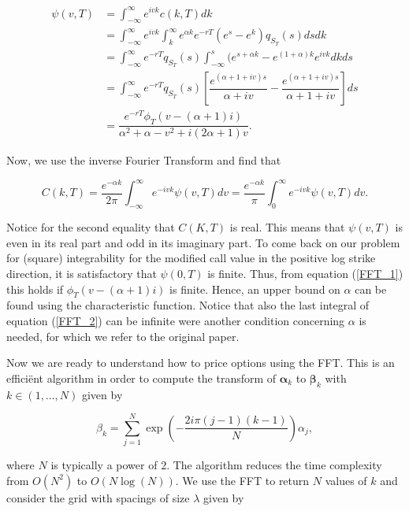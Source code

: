 \documentclass[12pt,a4paper,oneside]{book}
\begin{document}
\begin{align}\label{FFT_1}
\psi(v,T) &= \int_{-\infty}^{\infty} e^{ivk} c(k,T) dk \nonumber  \\
		  &= \int_{-\infty}^{\infty} e^{ivk} \int_{k}^{\infty} e^{\alpha k} e^{-rT} (e^s - e^k) q_{S_T}(s) ds dk \nonumber \\
		  &= \int_{-\infty}^{\infty} e^{-rT} q_{S_T}(s) \int_{-\infty}^{s} (e^{s+\alpha k} - e^{(1+\alpha)k} e^{ivk} dk ds \nonumber \\
		  &= \int_{-\infty}^{\infty} e^{-rT} q_{S_T}(s) \left[\dfrac{e^{(\alpha+1+iv)s}}{\alpha+iv} - \dfrac{e^{(\alpha+1+iv)s}}{\alpha+1+iv}\right] ds \nonumber \\
		  &= \dfrac{e^{-rT} \phi_{T}(v- (\alpha+1)i)}{\alpha^2 + \alpha -v^2 + i(2\alpha+1)v}.
\end{align}

Now, we use the inverse Fourier Transform and find that

\begin{equation}\label{FFT_2}
C(k,T) = \dfrac{e^{-\alpha k}}{2 \pi}\int_{-\infty}^{\infty} e^{-ivk} \psi(v,T) dv = \dfrac{e^{-\alpha k}}{ \pi}\int_{0}^{\infty} e^{-ivk} \psi(v,T) dv.
\end{equation}

Notice for the second equality that $C(K,T)$ is real. This means that $\psi(v,T)$ is even in its real part and odd in its imaginary part. To come back on our problem for (square) integrability for the modified call value in the positive log strike direction, it is satisfactory that $\psi(0,T)$ is finite. Thus, from equation (\ref{FFT_1}) this holds if $\phi_{T}(v- (\alpha+1)i)$ is finite. Hence, an upper bound on $\alpha$ can be found using the characteristic function. Notice that also the last integral of equation (\ref{FFT_2}) can be infinite were another condition concerning $\alpha$ is needed, for which we refer to the original paper. 

Now we are ready to understand how to price options using the FFT. This is an effici\"{e}nt algorithm in order to compute the transform of $\bm{\alpha}_k$ to $\bm{\beta}_k$ with $k \in (1,\ldots,N)$ given by

\begin{equation}\label{FFT_5}
\beta_k = \sum\limits_{j=1}^{N} \exp \left( -\dfrac{2i\pi(j-1)(k-1)}{N}\right)\alpha_j,
\end{equation}

where $N$ is typically a power of $2$.  The algorithm reduces the time complexity from $O(N^2)$ to $O(N \log(N))$. We use the FFT to return $N$ values of $k$ and consider the grid with spacings of size $\lambda$ given by
\end{document}
